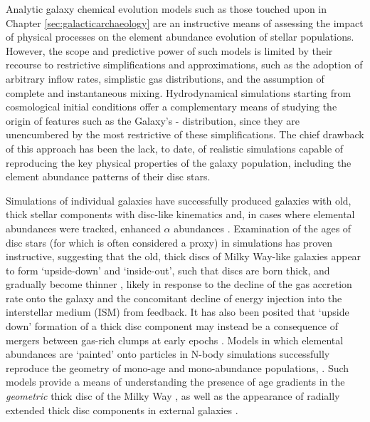 Analytic galaxy chemical evolution models such as those touched upon in Chapter \ref{sec:galacticarchaeology} are an instructive means of assessing the impact of physical processes on the element abundance evolution of stellar populations. However, the scope and predictive power of such models is limited by their recourse to restrictive simplifications and approximations, such as the adoption of arbitrary inflow rates, simplistic gas distributions, and the assumption of complete and instantaneous mixing. Hydrodynamical simulations starting from cosmological initial conditions offer a complementary means of studying the origin of features such as the Galaxy's \afe{}-\feh{} distribution, since they are unencumbered by the most restrictive of these simplifications. The chief drawback of this approach has been the lack, to date, of realistic simulations capable of reproducing the key physical properties of the galaxy population, including the element abundance patterns of their disc stars.

Simulations of individual galaxies have successfully produced galaxies with old, thick stellar components with disc-like kinematics and, in cases where elemental abundances were tracked, enhanced $\alpha$ abundances \citep[e.g][]{2004ApJ...612..894B,2012MNRAS.426..690B,2013MNRAS.436..625S,2014MNRAS.442.2474M,2014MNRAS.443.2452M}. Examination of the ages of disc stars (for which \afe{} is often considered a proxy) in simulations has proven instructive, suggesting that the old, thick discs of Milky Way-like galaxies appear to form `upside-down' and `inside-out', such that discs are born thick, and gradually become thinner \citep[e.g][]{2006ApJ...639..126B,2013ApJ...773...43B,2016arXiv160804133M,2017arXiv170901040N}, likely in response to the decline of the gas accretion rate onto the galaxy and the concomitant decline of energy injection into the interstellar medium (ISM) from feedback. It has also been posited that `upside down' formation of a thick disc component may instead be a consequence of mergers between gas-rich clumps at early epochs \citep[e.g.][]{1998Natur.392..253N,2004ApJ...612..894B,2009ApJ...707L...1B}. Models in which elemental abundances are `painted' onto particles in N-body simulations successfully reproduce the geometry of mono-age and mono-abundance populations,  \citep[e.g.][]{2013A&A...558A...9M,2015ApJ...804L...9M,2017ApJ...834...27M}.  Such models provide a means of understanding the presence of age gradients in the \emph{geometric} thick disc of the Milky Way \citep[e.g.][and Chapter \ref{chapter:apogeestruc} of this thesis]{2016arXiv160901168M}, as well as the appearance of radially extended thick disc components in external galaxies \citep[e.g.][]{2006AJ....131..226Y}. 

